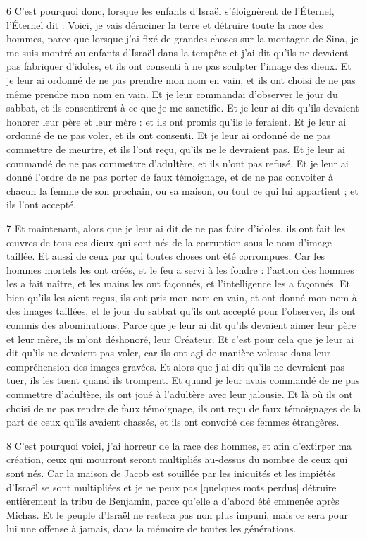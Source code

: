 \par 6 C'est pourquoi donc, lorsque les enfants d'Israël s'éloignèrent de l'Éternel, l'Éternel dit : Voici, je vais déraciner la terre et détruire toute la race des hommes, parce que lorsque j'ai fixé de grandes choses sur la montagne de Sina, je me suis montré au enfants d'Israël dans la tempête et j'ai dit qu'ils ne devaient pas fabriquer d'idoles, et ils ont consenti à ne pas sculpter l'image des dieux. Et je leur ai ordonné de ne pas prendre mon nom en vain, et ils ont choisi de ne pas même prendre mon nom en vain. Et je leur commandai d'observer le jour du sabbat, et ils consentirent à ce que je me sanctifie. Et je leur ai dit qu'ils devaient honorer leur père et leur mère : et ils ont promis qu'ils le feraient. Et je leur ai ordonné de ne pas voler, et ils ont consenti. Et je leur ai ordonné de ne pas commettre de meurtre, et ils l'ont reçu, qu'ils ne le devraient pas. Et je leur ai commandé de ne pas commettre d'adultère, et ils n'ont pas refusé. Et je leur ai donné l'ordre de ne pas porter de faux témoignage, et de ne pas convoiter à chacun la femme de son prochain, ou sa maison, ou tout ce qui lui appartient ; et ils l'ont accepté.

\par 7 Et maintenant, alors que je leur ai dit de ne pas faire d'idoles, ils ont fait les œuvres de tous ces dieux qui sont nés de la corruption sous le nom d'image taillée. Et aussi de ceux par qui toutes choses ont été corrompues. Car les hommes mortels les ont créés, et le feu a servi à les fondre : l'action des hommes les a fait naître, et les mains les ont façonnés, et l'intelligence les a façonnés. Et bien qu'ils les aient reçus, ils ont pris mon nom en vain, et ont donné mon nom à des images taillées, et le jour du sabbat qu'ils ont accepté pour l'observer, ils ont commis des abominations. Parce que je leur ai dit qu'ils devaient aimer leur père et leur mère, ils m'ont déshonoré, leur Créateur. Et c'est pour cela que je leur ai dit qu'ils ne devaient pas voler, car ils ont agi de manière voleuse dans leur compréhension des images gravées. Et alors que j’ai dit qu’ils ne devraient pas tuer, ils les tuent quand ils trompent. Et quand je leur avais commandé de ne pas commettre d'adultère, ils ont joué à l'adultère avec leur jalousie. Et là où ils ont choisi de ne pas rendre de faux témoignage, ils ont reçu de faux témoignages de la part de ceux qu'ils avaient chassés, et ils ont convoité des femmes étrangères.

\par 8 C'est pourquoi voici, j'ai horreur de la race des hommes, et afin d'extirper ma création, ceux qui mourront seront multipliés au-dessus du nombre de ceux qui sont nés. Car la maison de Jacob est souillée par les iniquités et les impiétés d'Israël se sont multipliées et je ne peux pas [quelques mots perdus] détruire entièrement la tribu de Benjamin, parce qu'elle a d'abord été emmenée après Michas. Et le peuple d'Israël ne restera pas non plus impuni, mais ce sera pour lui une offense à jamais, dans la mémoire de toutes les générations.

